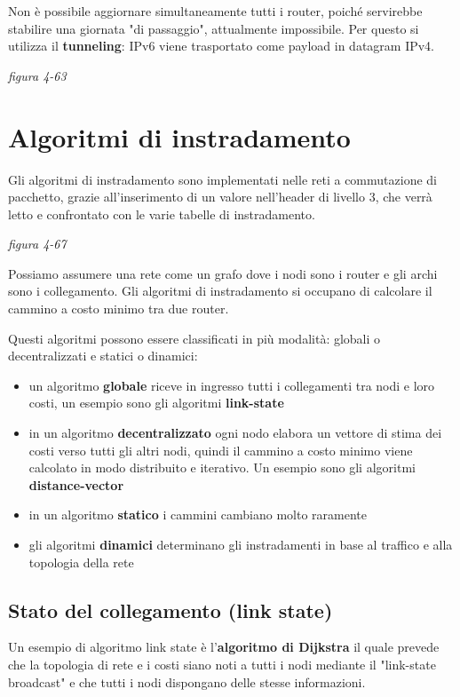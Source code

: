 \documentclass[
]{article}
\begin{document}
Non è possibile aggiornare simultaneamente tutti i router, poiché
servirebbe stabilire una giornata "di passaggio", attualmente
impossibile. Per questo si utilizza il \textbf{tunneling}: IPv6 viene
trasportato come payload in datagram IPv4.

\emph{figura 4-63}

\hypertarget{header-n165}{%
\section{Algoritmi di instradamento}\label{header-n165}}

Gli algoritmi di instradamento sono implementati nelle reti a
commutazione di pacchetto, grazie all'inserimento di un valore
nell'header di livello 3, che verrà letto e confrontato con le varie
tabelle di instradamento.

\emph{figura 4-67}

Possiamo assumere una rete come un grafo dove i nodi sono i router e gli
archi sono i collegamento. Gli algoritmi di instradamento si occupano di
calcolare il cammino a costo minimo tra due router.

Questi algoritmi possono essere classificati in più modalità: globali o
decentralizzati e statici o dinamici:

\begin{itemize}
\item
  un algoritmo \textbf{globale} riceve in ingresso tutti i collegamenti
  tra nodi e loro costi, un esempio sono gli algoritmi
  \textbf{link-state}
\item
  in un algoritmo \textbf{decentralizzato} ogni nodo elabora un vettore
  di stima dei costi verso tutti gli altri nodi, quindi il cammino a
  costo minimo viene calcolato in modo distribuito e iterativo. Un
  esempio sono gli algoritmi \textbf{distance-vector}
\item
  in un algoritmo \textbf{statico} i cammini cambiano molto raramente
\item
  gli algoritmi \textbf{dinamici} determinano gli instradamenti in base
  al traffico e alla topologia della rete
\end{itemize}

\hypertarget{header-n179}{%
\subsection{Stato del collegamento (link state)}\label{header-n179}}

Un esempio di algoritmo link state è l'\textbf{algoritmo di Dijkstra} il
quale prevede che la topologia di rete e i costi siano noti a tutti i
nodi mediante il "link-state broadcast" e che tutti i nodi dispongano
delle stesse informazioni.
\end{document}
